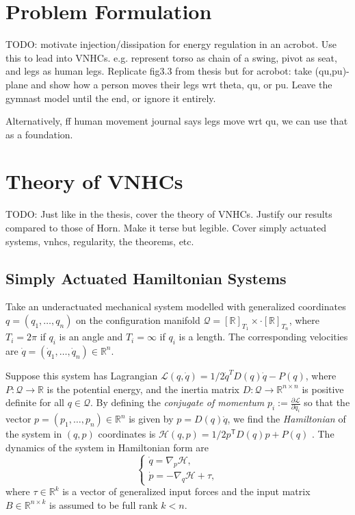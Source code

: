 \documentclass[journal,twoside,web]{ieeecolor}
\newcommand*{\tpose}{^\mathsf{T}}
\newcommand*{\Rt}[1]{[\R]_{#1}}
\newcommand*{\R}{\mathbb{R}}
\newcommand*{\pdiff}[2]{\frac{\partial #1}{\partial #2}}
\begin{document}
\section{Problem Formulation}\label{sec:problem-formulation}
TODO: motivate injection/dissipation for energy regulation in an acrobot. Use
this to lead into VNHCs. e.g. represent torso as chain of a swing, pivot as
seat, and legs as human legs. Replicate fig3.3 from thesis but for acrobot: take
(qu,pu)-plane and show how a person moves their legs wrt theta, qu, or pu. Leave
the gymnast model until the end, or ignore it entirely.

Alternatively, ff human movement journal says legs move wrt qu, we can use that
as a foundation.

\section{Theory of VNHCs}\label{sec:vnhc}
TODO: Just like in the thesis, cover the theory of VNHCs. Justify our results compared
to those of Horn. Make it terse but legible. Cover simply actuated systems,
vnhcs, regularity, the theorems, etc.


\subsection{Simply Actuated Hamiltonian Systems}
Take an underactuated mechanical system modelled with generalized coordinates 
\(q = (q_1, \ldots, q_n)\) on the configuration manifold
\(\mathcal{Q} = \Rt{T_1} \times \cdot \Rt{T_n}\), where
\(T_i = 2\pi\) if \(q_i\) is an angle and \(T_i = \infty\) if \(q_i\) is a
length. The corresponding velocities are 
\(\dot{q} = (\dot{q}_1,\ldots,\dot{q}_n) \in \R^n\).

Suppose this system has Lagrangian
\(\mathcal{L}(q,\dot{q}) = 1/2 \dot{q}^T D(q) \dot{q} - P(q)\),
where \(P : \mathcal{Q} \rightarrow \mathbb{R}\) is the potential energy, and
the inertia matrix \(D : \mathcal{Q} \rightarrow \mathbb{R}^{n \times n}\)
is positive definite for all \(q \in \mathcal{Q}\).
By defining the \textit{conjugate of momentum} 
\(p_i := \pdiff{\mathcal{L}}{\dot{q}_i}\) so that the vector 
\(p = (p_1,\ldots,p_n) \in \R^n\) is given by \(p = D(q)\dot{q}\),
we find the \textit{Hamiltonian} of the system in \((q,p)\) coordinates is
\(\mathcal{H}(q,p) = 1/2 p\tpose D(q) p + P(q)\) \cite{landau_mechanics}.
The dynamics of the system in Hamiltonian form are
\begin{equation}\label{eqn:hamiltonian-eom-general}
    \begin{cases}
        \dot{q} = \nabla_p\mathcal{H} 
        , \\
        \dot{p} = -\nabla_q\mathcal{H} + \tau
        ,
    \end{cases}
\end{equation}
where \(\tau \in \R^k\) is a vector of generalized input forces and the input
matrix \(B \in \R^{n \times k}\) is assumed to be full rank \(k < n\).
\end{document}
